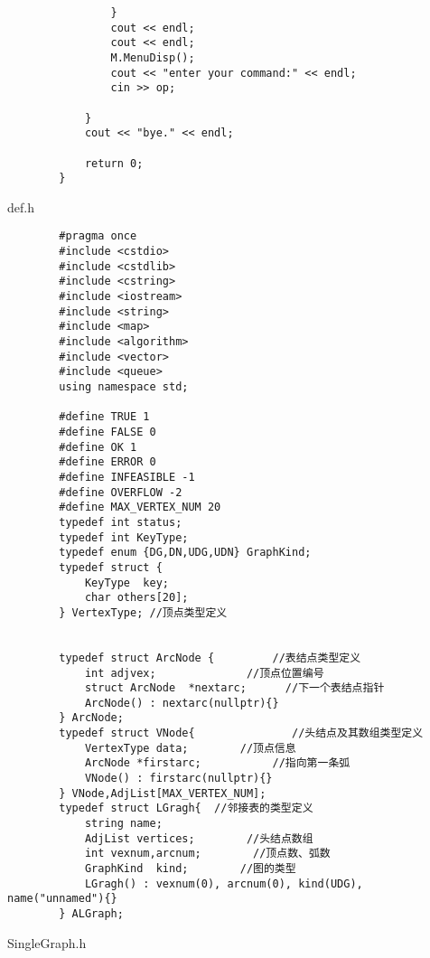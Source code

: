 \documentclass[supercite]{Experimental_Report}
\begin{document}
\begin{lstlisting}
				}
				cout << endl;
				cout << endl;
				M.MenuDisp();
				cout << "enter your command:" << endl;
				cin >> op;
				
			}
			cout << "bye." << endl;
			
			return 0;
		}
	\end{lstlisting}
	def.h
	\begin{lstlisting}
		#pragma once
		#include <cstdio>
		#include <cstdlib>
		#include <cstring>
		#include <iostream>
		#include <string>
		#include <map>
		#include <algorithm>
		#include <vector>
		#include <queue>
		using namespace std;
		
		#define TRUE 1
		#define FALSE 0
		#define OK 1
		#define ERROR 0
		#define INFEASIBLE -1
		#define OVERFLOW -2
		#define MAX_VERTEX_NUM 20
		typedef int status;
		typedef int KeyType;
		typedef enum {DG,DN,UDG,UDN} GraphKind;
		typedef struct {
			KeyType  key;
			char others[20];
		} VertexType; //顶点类型定义
		
		
		typedef struct ArcNode {         //表结点类型定义
			int adjvex;              //顶点位置编号
			struct ArcNode  *nextarc;	   //下一个表结点指针
			ArcNode() : nextarc(nullptr){}
		} ArcNode;
		typedef struct VNode{				//头结点及其数组类型定义
			VertexType data;       	//顶点信息
			ArcNode *firstarc;      	 //指向第一条弧
			VNode() : firstarc(nullptr){}
		} VNode,AdjList[MAX_VERTEX_NUM];
		typedef struct LGragh{  //邻接表的类型定义
			string name;
			AdjList vertices;     	 //头结点数组
			int vexnum,arcnum;   	  //顶点数、弧数
			GraphKind  kind;        //图的类型
			LGragh() : vexnum(0), arcnum(0), kind(UDG), name("unnamed"){}
		} ALGraph;
	\end{lstlisting}
	SingleGraph.h
\end{document}

